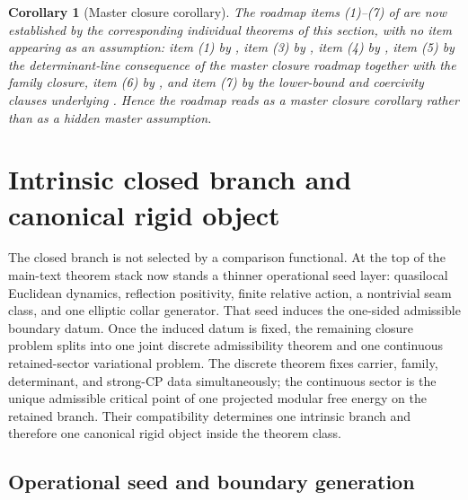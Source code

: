 \documentclass[11pt,a4paper]{article}
\newtheorem{corollary}[theorem]{Corollary}
\theoremstyle{definition}
\theoremstyle{remark}
\begin{document}
\begin{corollary}[Master closure corollary]
\label{cor:master-closure-corollary}
The roadmap items (1)--(7) of  are now established by
the corresponding individual theorems of this section, with no item appearing as an assumption:
item (1) by , item (3) by , item (4) by
, item (5) by the determinant-line consequence of the
master closure roadmap together with the family closure, item (6) by
, and item (7) by the lower-bound and coercivity
clauses underlying . Hence the roadmap reads as a
master closure corollary rather than as a hidden master assumption.
\end{corollary}

\section{Intrinsic closed branch and canonical rigid object}
\label{sec:rg-map-compiler-outputs}

The closed branch is not selected by a comparison functional. At the top of the main-text theorem
stack now stands a thinner operational seed layer: quasilocal Euclidean dynamics, reflection
positivity, finite relative action, a nontrivial seam class, and one elliptic collar generator.
That seed induces the one-sided admissible boundary datum. Once the induced datum is fixed, the
remaining closure problem splits into one joint discrete admissibility theorem and one continuous
retained-sector variational problem. The discrete theorem fixes carrier, family, determinant, and
strong-CP data simultaneously; the continuous sector is the unique admissible critical point of one
projected modular free energy on the retained branch. Their compatibility determines one intrinsic
branch and therefore one canonical rigid object inside the theorem class.

\subsection{Operational seed and boundary generation}
\label{sec:operational-seed-generation}
\end{document}
